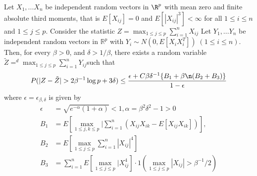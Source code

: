 \documentclass[uplatex,dvipdfmx]{jsarticle}
\begin{document}
\begin{lemma}
    \label{lem:refinedcoup}
    Let $X_1, ... X_n $ be independent random vectors in $\R^p$ with mean zero and finite absolute third moments, that is $E[X_{ij}] = 0 $ and $E[ | X_{ij}|^3] < \infty $ for all $ 1 \leq i \leq n $ and $1 \leq j \leq p $. Consider the statistic $Z = \max _ { 1 \leq j \leq p} \sum_{i=1}^n X_{ij} $ Let 
    $Y_1, ... Y_n$ be independent random vectors in $\mathbb{R}^p$ with $Y_i \sim N(0, E[ X_i X_i ^T ])\;(1 \leq i \leq n)$. Then, for every $\beta >0$, and $ \delta > 1/ \beta $, there exists a random variable $ \tilde{Z} =^d \max_{ 1 \leq j \leq p }  \sum_{i=1}^ n Y_{ij} $such that 
    \begin{equation}
        P( | Z  - \tilde{Z} | > 2 \beta ^{-1} \log p + 3 \delta ) \leq \frac{ \epsilon + C \beta \delta^{-1}\{ B_1 + \beta \n ( B_2 + B_3)\} } { 1 - \epsilon}\\
    \end{equation}
    where $\epsilon = \epsilon_{\beta, \delta}$ is given by 
    \begin{align}
        \epsilon &= \sqrt{e^{-\alpha}( 1+ \alpha) } < 1  , \alpha = \beta^2 \delta^2 -1 >0 \\
        B_1 &= E [ \max_{ 1 \leq j,k \leq p}| \sum_{i=1}^n(X_{ij}X_{ik} - E[ X_{ij}X_{ik}])], \\
        B_2 &= E[ \max_ { 1 \leq j \leq p} \sum_{i=1}^n | X_{ij}|^4]\\
        B_3 &= \sum_{i=1}^n E[ \max_{ 1 \leq j \leq p} | X_{ij}^4] \cdot 1( \max_{1 \leq j \leq p } | X_{ij}| > \beta^{-1}/2)
    \end{align}
\end{lemma} 
\end{document}
